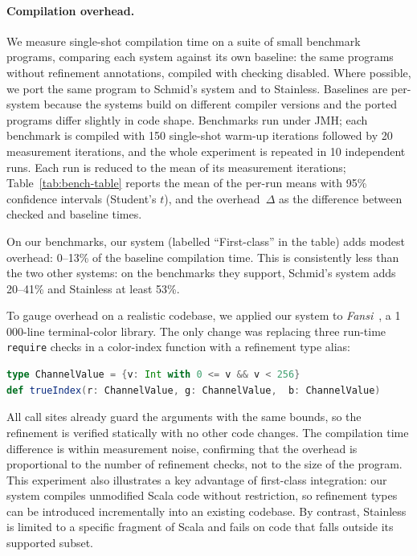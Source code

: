 \documentclass[acmsmall]{acmart}
\begin{document}
\paragraph{Compilation overhead.}
We measure single-shot compilation time on a suite of small benchmark programs, comparing each system against its own baseline: the same programs without refinement annotations, compiled with checking disabled. Where possible, we port the same program to Schmid's system and to Stainless. Baselines are per-system because the systems build on different compiler versions and the ported programs differ slightly in code shape. Benchmarks run under JMH; each benchmark is compiled with 150 single-shot warm-up iterations followed by 20 measurement iterations, and the whole experiment is repeated in 10 independent runs. Each run is reduced to the mean of its measurement iterations; Table~\ref{tab:bench-table} reports the mean of the per-run means with 95\% confidence intervals (Student's $t$), and the overhead~$\Delta$ as the difference between checked and baseline times.

On our benchmarks, our system (labelled ``First-class'' in the table) adds modest overhead: 0--13\% of the baseline compilation time. This is consistently less than the two other systems: on the benchmarks they support, Schmid's system adds 20--41\% and Stainless at least 53\%.

To gauge overhead on a realistic codebase, we applied our system to \emph{Fansi}~\cite{fansi}, a 1\,000-line terminal-color library. The only change was replacing three run-time \lstinline!require! checks in a color-index function with a refinement type alias:
%
\begin{lstlisting}[language=Scala]
type ChannelValue = {v: Int with 0 <= v && v < 256}
def trueIndex(r: ChannelValue, g: ChannelValue,  b: ChannelValue)
\end{lstlisting}
%
All call sites already guard the arguments with the same bounds, so the refinement is verified statically with no other code changes. The compilation time difference is within measurement noise, confirming that the overhead is proportional to the number of refinement checks, not to the size of the program. This experiment also illustrates a key advantage of first-class integration: our system compiles unmodified Scala code without restriction, so refinement types can be introduced incrementally into an existing codebase. By contrast, Stainless is limited to a specific fragment of Scala and fails on code that falls outside its supported subset.
\end{document}
